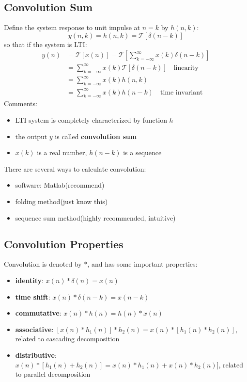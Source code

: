\documentclass[10pt,a4paper,oneside]{article}
\begin{document}
\subsection{Convolution Sum}
Define the system response to unit impulse at $n = k$ by $h(n, k)$:
\[
y(n,k) = h(n, k) = \mathcal{T}[\delta(n-k)]
\]
so that if the system is LTI:
\begin{align*}
y(n) &= \mathcal{T}[x(n)] = \mathcal{T} \left[ \sum_{k=-\infty}^{\infty} x(k) \delta(n-k) \right]\\
&= \sum_{k=-\infty}^{\infty} x(k) \mathcal{T}[ \delta(n-k)] \quad \text{linearity}\\
&= \sum_{k=-\infty}^{\infty} x(k) h(n,k)\\
&= \sum_{k=-\infty}^{\infty} x(k) h(n-k) \quad \text{time invariant}
\end{align*}
Comments:
\begin{itemize}
	\item LTI system is completely characterized by function $h$
	\item the output $y$ is called \textbf{convolution sum}
	\item $x(k)$ is a real number, $h(n-k)$ is a sequence
\end{itemize}
There are several ways to calculate convolution:
\begin{itemize}
	\item software: Matlab(recommend)
	\item folding method(just know this)
	\item sequence sum method(highly recommended, intuitive)
\end{itemize}

\subsection{Convolution Properties}
Convolution is denoted by $*$, and has some important properties:
\begin{itemize}
	\item \textbf{identity}: $x(n) * \delta(n) = x(n)$
	\item \textbf{time shift}: $x(n) * \delta(n-k) = x(n-k)$
	\item \textbf{commutative}: $x(n) * h(n) = h(n) * x(n)$
	\item \textbf{associative}: $[x(n) * h_1(n)] *h_2(n) = x(n) * [h_1(n) *h_2(n)]$, related to cascading decomposition 
	\item \textbf{distributive}: $x(n) * [h_1(n) + h_2(n)] = x(n) * h_1(n) + x(n) *h_2(n)]$, related to parallel decomposition 
\end{itemize}
\end{document}
